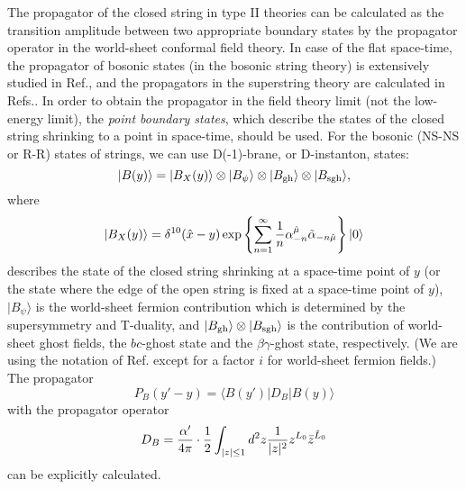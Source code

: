 \documentclass[a4paper,prd,preprint]{revtex4}
\begin{document}
The propagator of the closed string in type II theories
 can be calculated as the transition amplitude
 between two appropriate boundary states
 by the propagator operator
 in the world-sheet conformal field theory.
In case of the flat space-time,
 the propagator of bosonic states (in the bosonic string theory)
 is extensively studied in Ref.\cite{CMNP},
 and the propagators in the superstring theory
 are calculated in Refs.\cite{Fainberg-Marshakov,Marshakov}.
In order to obtain the propagator
 in the field theory limit (not the low-energy limit),
 the {\it point boundary states},
 which describe the states of the closed string
 shrinking to a point in space-time,
 should be used.
For the bosonic (NS-NS or R-R) states of strings,
 we can use D(-1)-brane, or D-instanton, states\cite{DFPSLR}:
\begin{equation}
 | B(y) \rangle = | B_X(y) \rangle
                \otimes | B_\psi \rangle
                \otimes  | B_{\rm gh} \rangle
                \otimes | B_{\rm sgh} \rangle,
\end{equation}
 where
\begin{equation}
 | B_X(y) \rangle
 = \delta^{10} ({\hat x}-y)
   \exp \left\{
    {\sum_{n=1}^\infty {1 \over n}
     \alpha^{\hat \mu}_{-n} {\tilde \alpha}_{-n {\hat \mu}}} \right\}
   | 0 \rangle
\label{B_X}
\end{equation}
 describes the state of the closed string
 shrinking at a space-time point of $y$ 
 (or the state where the edge of the open string
 is fixed at a space-time point of $y$),
 $| B_\psi \rangle$ is the world-sheet fermion contribution
 which is determined by the supersymmetry and T-duality,
 and $| B_{\rm gh} \rangle \otimes | B_{\rm sgh} \rangle$
 is the contribution of world-sheet ghost fields,
 the $bc$-ghost state and the $\beta\gamma$-ghost state, respectively.
(We are using the notation of Ref.\cite{Polchinski}
 except for a factor $i$ for world-sheet fermion fields.)
The propagator
\begin{equation}
 P_B(y'-y) = \langle B(y') | D_B | B(y) \rangle
\end{equation}
 with the propagator operator
\begin{equation}
 D_B = {{\alpha'} \over {4\pi}} \cdot {1 \over 2}
       \int_{|z| \le 1} d^2z {1 \over {|z|^2}}
       z^{L_0} {\bar z}^{{\tilde L}_0}
\end{equation}
 can be explicitly calculated.
\end{document}
